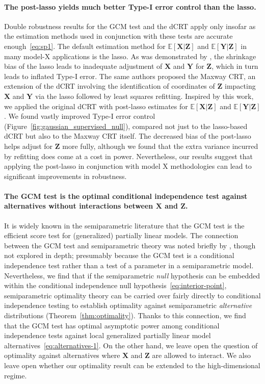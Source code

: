\documentclass[12pt]{article}
\theoremstyle{definition}
\theoremstyle{remark}
\newcommand{\E}{\mathbb E}								%
\newcommand{\prx}{\bm X}								%
\newcommand{\prz}{\bm Z}								%
\newcommand{\pry}{{\bm Y}}								%
\begin{document}
\paragraph{The post-lasso yields much better Type-I error control than the lasso.}

Double robustness results for the GCM test and the dCRT apply only insofar as the estimation methods used in conjunction with these tests are accurate enough~\eqref{eq:sp1}. The default estimation method for $\E[\prx|\prz]$ and $\E[\pry|\prz]$ in many model-X applications is the lasso. As was demonstrated by \cite{Li2022}, the shrinkage bias of the lasso leads to inadequate adjustment of $\prx$ and $\pry$ for $\prz$, which in turn leads to inflated Type-I error. The same authors proposed the Maxway CRT, an extension of the dCRT involving the identification of coordinates of $\prz$ impacting $\prx$ and $\pry$ via the lasso followed by least squares refitting. Inspired by this work, we applied the original dCRT with post-lasso estimates for $\E[\prx|\prz]$ and $\E[\pry|\prz]$. We found vastly improved Type-I error control (Figure~\ref{fig:gaussian_supervised_null}), compared not just to the lasso-based dCRT but also to the Maxway CRT itself. The decreased bias of the post-lasso helps adjust for $\prz$ more fully, although we found that the extra variance incurred by refitting does come at a cost in power. Nevertheless, our results suggest that applying the post-lasso in conjunction with model X methodologies can lead to significant improvements in robustness.

\paragraph{The GCM test is the optimal conditional independence test against alternatives without interactions between $\prx$ and $\prz$.} 

It is widely known in the semiparametric literature that the GCM test is the efficient score test for (generalized) partially linear models. The connection between the GCM test and semiparametric theory was noted briefly by \citet{Shah2018}, though not explored in depth; presumably because the GCM test is a conditional independence test rather than a test of a parameter in a semiparametric model. Nevertheless, we find that if the semiparametric \textit{null} hypothesis can be embedded within the conditional independence null hypothesis~\eqref{eq:interior-point}, semiparametric optimality theory can be carried over fairly directly to conditional independence testing to establish optimality against semiparametric \textit{alternative} distributions (Theorem~\ref{thm:optimality}). Thanks to this connection, we find that the GCM test has optimal asymptotic power among conditional independence tests against local generalized partially linear model alternatives~\eqref{eq:alternatives-1}. On the other hand, we leave open the question of optimality against alternatives where $\prx$ and $\prz$ are allowed to interact. We also leave open whether our optimality result can be extended to the high-dimensional regime.
\end{document}

